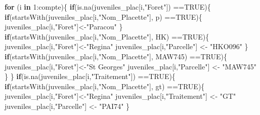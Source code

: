 \documentclass[
  12pt,
  american,
  a4paper,
  extrafontsizes,onecolumn,openright
  ]{memoir}
\newenvironment{Shaded}{\begin{snugshade}}{\end{snugshade}}
\newcommand{\ConstantTok}[1]{\textcolor[rgb]{0.00,0.00,0.00}{#1}}
\newcommand{\ControlFlowTok}[1]{\textcolor[rgb]{0.13,0.29,0.53}{\textbf{#1}}}
\newcommand{\DecValTok}[1]{\textcolor[rgb]{0.00,0.00,0.81}{#1}}
\newcommand{\FunctionTok}[1]{\textcolor[rgb]{0.00,0.00,0.00}{#1}}
\newcommand{\NormalTok}[1]{#1}
\newcommand{\OtherTok}[1]{\textcolor[rgb]{0.56,0.35,0.01}{#1}}
\newcommand{\SpecialCharTok}[1]{\textcolor[rgb]{0.00,0.00,0.00}{#1}}
\newcommand{\StringTok}[1]{\textcolor[rgb]{0.31,0.60,0.02}{#1}}
\begin{document}
\begin{Shaded}
\begin{Highlighting}[]
\ControlFlowTok{for}\NormalTok{ (i }\ControlFlowTok{in} \DecValTok{1}\SpecialCharTok{:}\NormalTok{compte)\{}
  \ControlFlowTok{if}\NormalTok{(}\FunctionTok{is.na}\NormalTok{(juveniles\_plac[i,}\StringTok{"Foret"}\NormalTok{]) }\SpecialCharTok{==}\ConstantTok{TRUE}\NormalTok{)\{}
    \ControlFlowTok{if}\NormalTok{(}\FunctionTok{startsWith}\NormalTok{(juveniles\_plac[i,}\StringTok{"Nom\_Placette"}\NormalTok{], }\StringTok{\textquotesingle{}p\textquotesingle{}}\NormalTok{) }\SpecialCharTok{==}\ConstantTok{TRUE}\NormalTok{)\{}
\NormalTok{    juveniles\_plac[i,}\StringTok{"Foret"}\NormalTok{]}\OtherTok{\textless{}{-}}\StringTok{"Paracou"}
\NormalTok{    \}}
    \ControlFlowTok{if}\NormalTok{(}\FunctionTok{startsWith}\NormalTok{(juveniles\_plac[i,}\StringTok{"Nom\_Placette"}\NormalTok{], }\StringTok{\textquotesingle{}HK\textquotesingle{}}\NormalTok{) }\SpecialCharTok{==}\ConstantTok{TRUE}\NormalTok{)\{}
\NormalTok{    juveniles\_plac[i,}\StringTok{"Foret"}\NormalTok{]}\OtherTok{\textless{}{-}}\StringTok{"Regina"}
\NormalTok{    juveniles\_plac[i,}\StringTok{"Parcelle"}\NormalTok{] }\OtherTok{\textless{}{-}} \StringTok{"HKO096"}
\NormalTok{    \}}
    \ControlFlowTok{if}\NormalTok{(}\FunctionTok{startsWith}\NormalTok{(juveniles\_plac[i,}\StringTok{"Nom\_Placette"}\NormalTok{], }\StringTok{\textquotesingle{}MAW745\textquotesingle{}}\NormalTok{) }\SpecialCharTok{==}\ConstantTok{TRUE}\NormalTok{)\{}
\NormalTok{    juveniles\_plac[i,}\StringTok{"Foret"}\NormalTok{]}\OtherTok{\textless{}{-}}\StringTok{"St Georges"}
\NormalTok{    juveniles\_plac[i,}\StringTok{"Parcelle"}\NormalTok{] }\OtherTok{\textless{}{-}} \StringTok{"MAW745"}
\NormalTok{    \}}
\NormalTok{  \}}
  \ControlFlowTok{if}\NormalTok{(}\FunctionTok{is.na}\NormalTok{(juveniles\_plac[i,}\StringTok{"Traitement"}\NormalTok{]) }\SpecialCharTok{==}\ConstantTok{TRUE}\NormalTok{)\{  }
    \ControlFlowTok{if}\NormalTok{(}\FunctionTok{startsWith}\NormalTok{(juveniles\_plac[i,}\StringTok{"Nom\_Placette"}\NormalTok{], }\StringTok{\textquotesingle{}gt\textquotesingle{}}\NormalTok{) }\SpecialCharTok{==}\ConstantTok{TRUE}\NormalTok{)\{}
\NormalTok{    juveniles\_plac[i,}\StringTok{"Foret"}\NormalTok{]}\OtherTok{\textless{}{-}}\StringTok{"Regina"}
\NormalTok{    juveniles\_plac[i,}\StringTok{"Traitement"}\NormalTok{] }\OtherTok{\textless{}{-}} \StringTok{"GT"}
\NormalTok{    juveniles\_plac[i,}\StringTok{"Parcelle"}\NormalTok{] }\OtherTok{\textless{}{-}} \StringTok{"PAI74"}
\NormalTok{    \} }
  

\end{Highlighting}
\end{Shaded}
\end{document}
